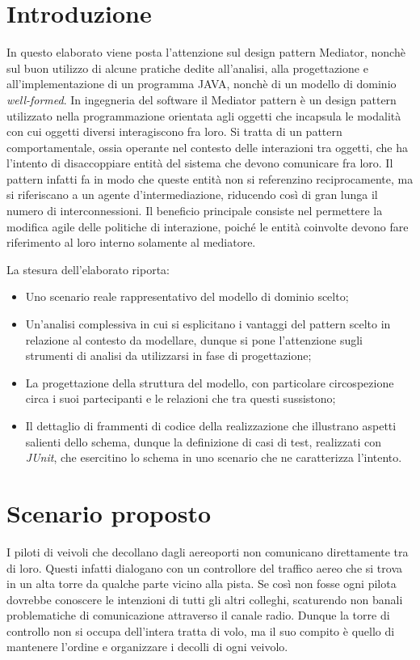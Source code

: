\documentclass{article}
\begin{document}
\begin{sloppy}
    

\section{Introduzione}
In questo elaborato viene posta l'attenzione sul design pattern Mediator, nonchè sul buon utilizzo di alcune pratiche dedite all'analisi, alla progettazione e 
all'implementazione di un programma JAVA, nonchè di un modello di dominio \textit{well-formed}.
\bigbreak
In ingegneria del software il Mediator pattern è un design pattern utilizzato nella programmazione orientata agli oggetti che incapsula le modalità con cui oggetti diversi interagiscono fra loro.
Si tratta di un pattern comportamentale, ossia operante nel contesto delle interazioni tra oggetti, che ha l'intento di disaccoppiare entità del sistema che devono comunicare fra loro. Il pattern infatti fa in modo che queste entità non si referenzino reciprocamente, ma si riferiscano a un agente d'intermediazione, riducendo così di gran lunga il numero di interconnessioni.
Il beneficio principale consiste nel permettere la modifica agile delle politiche di interazione, poiché le entità coinvolte devono fare riferimento al loro interno solamente al mediatore. 

\bigbreak
La stesura dell'elaborato riporta:
\begin{itemize}
\item Uno scenario reale rappresentativo del modello di dominio scelto;
\item Un'analisi complessiva in cui si esplicitano i vantaggi del pattern scelto in relazione al contesto da modellare, dunque si pone l'attenzione sugli strumenti di analisi da utilizzarsi in fase di progettazione;
\item La progettazione della struttura del modello, con particolare circospezione circa i suoi partecipanti e le relazioni che tra questi sussistono;
\item Il dettaglio di frammenti di codice della realizzazione che illustrano aspetti salienti dello schema, dunque la definizione di casi di test, realizzati con \textit{JUnit}, che esercitino lo schema in uno scenario che ne caratterizza l’intento.
\end{itemize}

\section{Scenario proposto}
I piloti di veivoli che decollano dagli aereoporti non comunicano direttamente tra di loro. Questi infatti dialogano con un controllore del traffico aereo che si trova in un alta torre da qualche parte vicino alla pista. Se così non fosse ogni pilota dovrebbe conoscere le intenzioni di tutti gli altri colleghi, scaturendo non banali problematiche di comunicazione attraverso il canale radio. Dunque la torre di controllo non si occupa dell'intera tratta di volo, ma il suo compito è quello di mantenere l'ordine e organizzare i decolli di ogni veivolo.


\end{sloppy}
\end{document}

